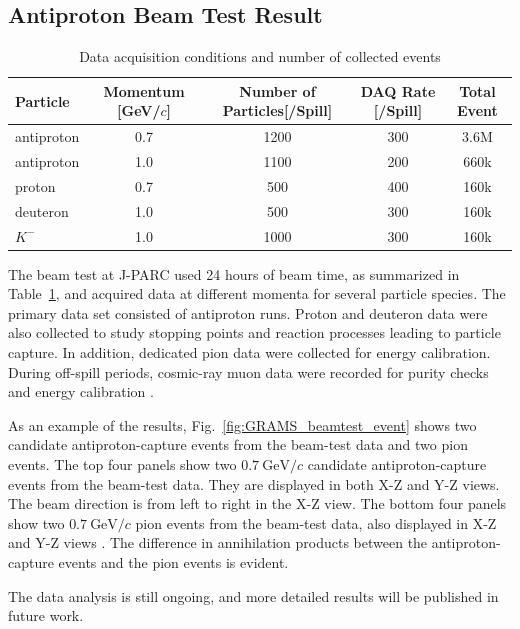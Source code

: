 \subsection{Antiproton Beam Test Result}
\label{chap:GRAMS:beamtest:result}
\begin{table}
\centering
\caption{Data acquisition conditions and number of collected events}
\label{tab:beam_time_summary}
\small
\begin{tabular}{lcccc}
\toprule
\textbf{Particle} & \textbf{Momentum [GeV/$c$]} & \textbf{Number of Particles[/Spill]} & \textbf{DAQ Rate [/Spill]} & \textbf{Total Event} \\
\midrule
antiproton & 0.7 & 1200 & 300 & 3.6M \\
antiproton & 1.0 & 1100 & 200 & 660k \\
proton & 0.7 & 500 & 400 & 160k \\
deuteron & 1.0 & 500 & 300 & 160k \\
$K^-$ & 1.0 & 1000 & 300 & 160k \\
\bottomrule
\end{tabular}
\end{table}

The beam test at J-PARC used 24 hours of beam time, as summarized in Table~\ref{tab:beam_time_summary}, and acquired data at different momenta for several particle species. The primary data set consisted of antiproton runs. Proton and deuteron data were also collected to study stopping points and reaction processes leading to particle capture. In addition, dedicated pion data were collected for energy calibration. During off-spill periods, cosmic-ray muon data were recorded for purity checks and energy calibration \cite{Yano:202503}.

As an example of the results, Fig.~\ref{fig:GRAMS_beamtest_event} shows two candidate antiproton-capture events from the beam-test data and two pion events. The top four panels show two $0.7~\text{GeV}/c$ candidate antiproton-capture events from the beam-test data. They are displayed in both X-Z and Y-Z views. The beam direction is from left to right in the X-Z view. The bottom four panels show two $0.7~\text{GeV}/c$ pion events from the beam-test data, also displayed in X-Z and Y-Z views \cite{Yano:202503}. The difference in annihilation products between the antiproton-capture events and the pion events is evident.

The data analysis is still ongoing, and more detailed results will be published in future work.

